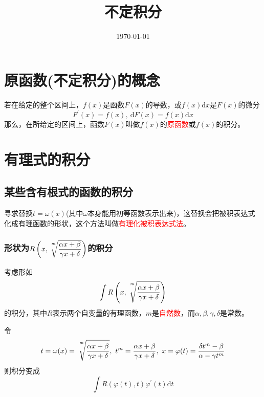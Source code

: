 \documentclass[12pt,a4paper]{article}
\title{不定积分}
\author{}
\date{\today}
\newcommand{\dif}{\mathrm{d}}
\begin{document}
\maketitle

\section{原函数(不定积分)的概念}

若在给定的整个区间上，$f(x)$是函数$F(x)$的导数，或$f(x)\dif x$是$F(x)$的微分
\begin{equation}
F^{\prime}(x) = f(x), ~\dif F(x) = f(x) \dif x
\end{equation}
那么，在所给定的区间上，函数$F(x)$叫做$f(x)$的\textcolor{red}{原函数}或$f(x)$的积分。

\section{有理式的积分}

\subsection{某些含有根式的函数的积分}

寻求替换$t = \omega(x)$(其中$\omega$本身能用初等函数表示出来)，这替换会把被积表达式化成有理函数的形状，这个方法叫做\textcolor{red}{有理化被积表达式法}。

\subsubsection{形状为$R\left(x, \sqrt[\uproot{10}\leftroot{-2}m]{\dfrac{\alpha x+\beta}{\gamma x+\delta}}  \right)$的积分}
考虑形如
\begin{equation}
\int R\left(x, \sqrt[\uproot{16}\leftroot{-2}m]{\frac{\alpha x+\beta}{\gamma x+\delta}}  \right)
\end{equation}
的积分，其中$R$表示两个自变量的有理函数，$m$是\textcolor{red}{自然数}，而$\alpha, \beta, \gamma, \delta$是常数。

令
\begin{equation}
t = \omega(x) = \sqrt[\uproot{16}\leftroot{-2}m]{\frac{\alpha x+\beta}{\gamma x+\delta}} , ~t^m = \frac{\alpha x+\beta}{\gamma x+\delta} , ~x = \varphi(t) = \frac{\delta t^m -\beta}{\alpha -\gamma t^m}
\end{equation}
则积分变成
\begin{equation}
\int R(\varphi(t), t) \varphi^{\prime}(t) \dif t
\end{equation}
\end{document}
